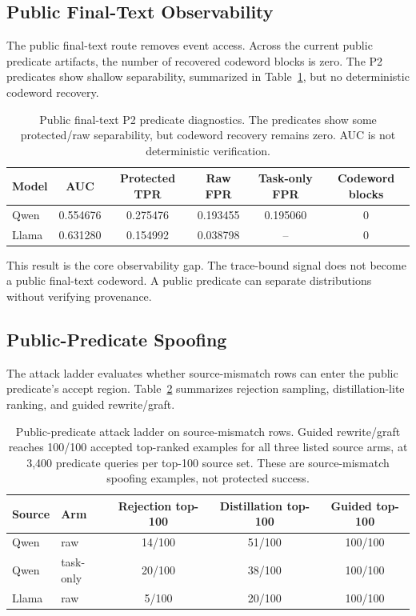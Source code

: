 \subsection{Public Final-Text Observability}
\label{subsec:public-text-results}

The public final-text route removes event access.  Across the current public
predicate artifacts, the number of recovered codeword blocks is zero.  The P2
predicates show shallow separability, summarized in
Table~\ref{tab:public-text-p2}, but no deterministic codeword recovery.

\begin{table}[t]
\centering
\small
\setlength{\tabcolsep}{4pt}
\begin{tabular}{lccccc}
\toprule
Model & AUC & Protected TPR & Raw FPR & Task-only FPR & Codeword blocks \\
\midrule
Qwen & 0.554676 & 0.275476 & 0.193455 & 0.195060 & 0 \\
Llama & 0.631280 & 0.154992 & 0.038798 & -- & 0 \\
\bottomrule
\end{tabular}
\caption{Public final-text P2 predicate diagnostics.  The predicates show
some protected/raw separability, but codeword recovery remains zero.  AUC is
not deterministic verification.}
\label{tab:public-text-p2}
\end{table}

This result is the core observability gap.  The trace-bound signal does not
become a public final-text codeword.  A public predicate can separate
distributions without verifying provenance.

\subsection{Public-Predicate Spoofing}
\label{subsec:attack-results}

The attack ladder evaluates whether source-mismatch rows can enter the public
predicate's accept region.  Table~\ref{tab:attack-ladder} summarizes rejection
sampling, distillation-lite ranking, and guided rewrite/graft.

\begin{table}[t]
\centering
\scriptsize
\setlength{\tabcolsep}{3pt}
\begin{tabular}{llccc}
\toprule
Source & Arm & Rejection top-100 & Distillation top-100 & Guided top-100 \\
\midrule
Qwen & raw & 14/100 & 51/100 & 100/100 \\
Qwen & task-only & 20/100 & 38/100 & 100/100 \\
Llama & raw & 5/100 & 20/100 & 100/100 \\
\bottomrule
\end{tabular}
\caption{Public-predicate attack ladder on source-mismatch rows.  Guided
rewrite/graft reaches 100/100 accepted top-ranked examples for all three
listed source arms, at 3,400 predicate queries per top-100 source set.  These
are source-mismatch spoofing examples, not protected success.}
\label{tab:attack-ladder}
\end{table}

